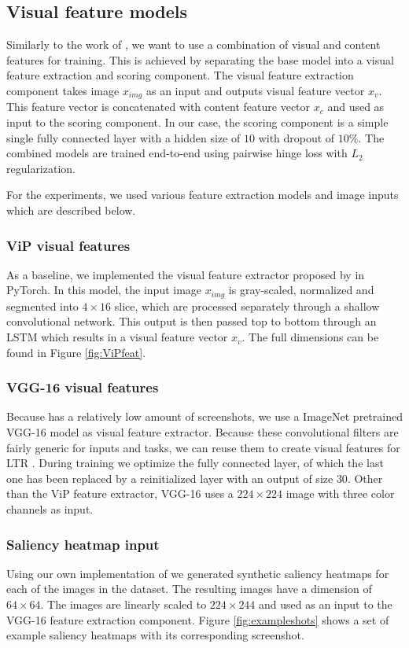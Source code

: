 \subsection{Visual feature models}
Similarly to the work of \citet{fan2017learning}, we want to use a combination of visual and content features for training. This is achieved by separating the base model into a visual feature extraction and scoring component. The visual feature extraction component takes image $x_{img}$ as an input and outputs visual feature vector $x_{v}$. This feature vector is concatenated with content feature vector $x_{c}$ and used as input to the scoring component. In our case, the scoring component is a simple single fully connected layer with a hidden size of $10$ with dropout of $10\%$. The combined models are trained end-to-end using pairwise hinge loss with $L_2$ regularization. 

For the experiments, we used various feature extraction models and image inputs which are described below.


\subsubsection{ViP visual features}
As a baseline, we implemented the visual feature extractor proposed by \citet{fan2017learning} in PyTorch. In this model, the input image $x_{img}$ is gray-scaled, normalized and segmented into $4\times16$ slice, which are processed separately through a shallow convolutional network. This output is then passed top to bottom through an LSTM which results in a visual feature vector $x_{v}$. The full dimensions can be found in Figure \ref{fig:ViPfeat}.

\subsubsection{VGG-16 visual features}
Because \datasetname has a relatively low amount of screenshots, we use a ImageNet pretrained VGG-16 \cite{simonyan2014very} model as visual feature extractor. Because these convolutional filters are fairly generic for inputs and tasks, we can reuse them to create visual features for \ac{LTR} . During training we optimize the fully connected layer, of which the last one has been replaced by a reinitialized layer with an output of size $30$.  Other than the ViP feature extractor, VGG-16 uses a $224\times224$ image with three color channels as input. 

\subsubsection{Saliency heatmap input}
Using our own implementation of \citet{shan2017two} we generated synthetic saliency heatmaps for each of the images in the \datasetname dataset. The resulting images have a dimension of $64\times64$. The images are linearly scaled to $224\times244$ and used as an input to the VGG-16 feature extraction component. Figure \ref{fig:exampleshots} shows a set of example saliency heatmaps with its corresponding screenshot. 

